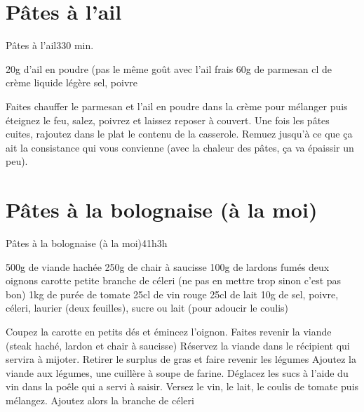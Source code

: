 {\section{Pâtes à l'ail}
\begin{recette}{Pâtes à l'ail}{3}{30 min.}{}
\begin{ingredients}
\ingredient 20g d'ail en poudre (pas le même  goût avec l'ail frais
\ingredient 60g de parmesan
 cl de crème liquide légère 
\ingredient sel, poivre
\end{ingredients}


\begin{preparation}
\etape Faites chauffer le parmesan et l'ail en poudre dans la crème pour mélanger puis éteignez le feu, salez, poivrez et laissez reposer à couvert.
\etape Une fois les pâtes cuites, rajoutez dans le plat le contenu de la casserole. Remuez jusqu'à ce que ça ait la consistance qui vous convienne (avec la chaleur des pâtes, ça va épaissir un peu).
\end{preparation}
\end{recette}

\section{Pâtes à la bolognaise (à la moi)}
\begin{recette}{Pâtes à la bolognaise (à la moi)}{4}{1h}{3h}
\begin{ingredients}
\ingredient 500g de viande hachée
\ingredient 250g de chair à saucisse
\ingredient 100g de lardons fumés
\ingredient deux oignons
 carotte
 petite branche de céleri (ne pas en mettre trop sinon c'est pas bon)
\ingredient 1kg de purée de tomate
\ingredient 25cl de vin rouge
\ingredient 25cl de lait
\ingredient 10g de sel, poivre, céleri, laurier (deux feuilles), sucre ou lait (pour adoucir le coulis)
\end{ingredients}

\begin{preparation}
\etape Coupez la carotte en petits dés et émincez l'oignon.
\etape Faites revenir la viande (steak haché, lardon et chair à saucisse)
\etape Réservez la viande dans le récipient qui servira à mijoter. 
\etape Retirer le surplus de gras et faire revenir les légumes
\etape Ajoutez la viande aux légumes, une cuillère à soupe de farine.
\etape Déglacez les sucs à l'aide du vin dans la poêle qui a servi à saisir. 
\etape Versez le vin, le lait, le coulis de tomate puis mélangez. Ajoutez alors la branche de céleri
\end{preparation}



\end{recette}}
